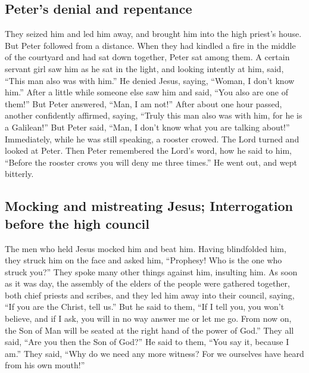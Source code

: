 \hypertarget{peters-denial-and-repentance}{%
\subsection{Peter's denial and
repentance}\label{peters-denial-and-repentance}}

 They seized him and led him away, and brought him into
the high priest's house. But Peter followed from a distance.
 When they had kindled a fire in the middle of the
courtyard and had sat down together, Peter sat among them.
 A certain servant girl saw him as he sat in the light,
and looking intently at him, said, ``This man also was with him.''
 He denied Jesus, saying, ``Woman, I don't know him.''
 After a little while someone else saw him and said,
``You also are one of them!'' But Peter answered, ``Man, I am not!''
 After about one hour passed, another confidently
affirmed, saying, ``Truly this man also was with him, for he is a
Galilean!''  But Peter said, ``Man, I don't know what you
are talking about!'' Immediately, while he was still speaking, a rooster
crowed.  The Lord turned and looked at Peter. Then Peter
remembered the Lord's word, how he said to him, ``Before the rooster
crows you will deny me three times.''  He went out, and
wept bitterly.

\hypertarget{mocking-and-mistreating-jesus-interrogation-before-the-high-council}{%
\subsection{Mocking and mistreating Jesus; Interrogation before the high
council}\label{mocking-and-mistreating-jesus-interrogation-before-the-high-council}}

 The men who held Jesus mocked him and beat him.
 Having blindfolded him, they struck him on the face and
asked him, ``Prophesy! Who is the one who struck you?'' 
They spoke many other things against him, insulting him. 
As soon as it was day, the assembly of the elders of the people were
gathered together, both chief priests and scribes, and they led him away
into their council, saying,  ``If you are the Christ,
tell us.'' But he said to them, ``If I tell you, you won't believe,
 and if I ask, you will in no way answer me or let me go.
 From now on, the Son of Man will be seated at the right
hand of the power of God.''  They all said, ``Are you
then the Son of God?'' He said to them, ``You say it, because I am.''
 They said, ``Why do we need any more witness? For we
ourselves have heard from his own mouth!''

